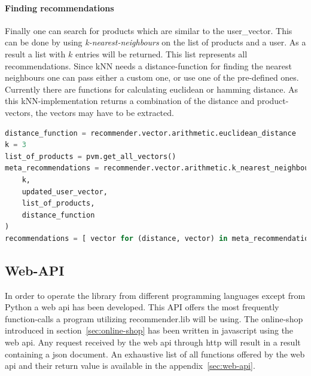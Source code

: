 \paragraph{Finding recommendations}
Finally one can search for products which are similar to the user\_vector.
This can be done by using \textit{k-nearest-neighbours} on the list of products and a user.
As a result a list with $k$ entries will be returned.
This list represents all recommendations.
Since kNN needs a distance-function for finding the nearest neighbours one can pass either a custom one, or use one of the pre-defined ones.
Currently there are functions for calculating euclidean or hamming distance.
As this kNN-implementation returns a combination of the distance and product-vectors, the vectors may have to be extracted.
\begin{lstlisting}[language=Python,caption={Retrieving recommendations},label={lst:recommenderlib-knn}]
distance_function = recommender.vector.arithmetic.euclidean_distance
k = 3
list_of_products = pvm.get_all_vectors()
meta_recommendations = recommender.vector.arithmetic.k_nearest_neighbours(
    k,
    updated_user_vector,
    list_of_products,
    distance_function
)
recommendations = [ vector for (distance, vector) in meta_recommendations ]
\end{lstlisting}

\subsection{Web-API}
In order to operate the library from different programming languages except from Python a \gls{web api} has been developed.
This API offers the most frequently function-calls a program utilizing recommender.lib will be using.
The online-shop introduced in section~\ref{sec:online-shop} has been written in \gls{javascript} using the \gls{web api}.
Any request received by the web api through \gls{http} will result in a result containing a \gls{json} document.
An exhaustive list of all functions offered by the \gls{web api} and their return value is available in the appendix~\ref{sec:web-api}.


\FloatBarrier

